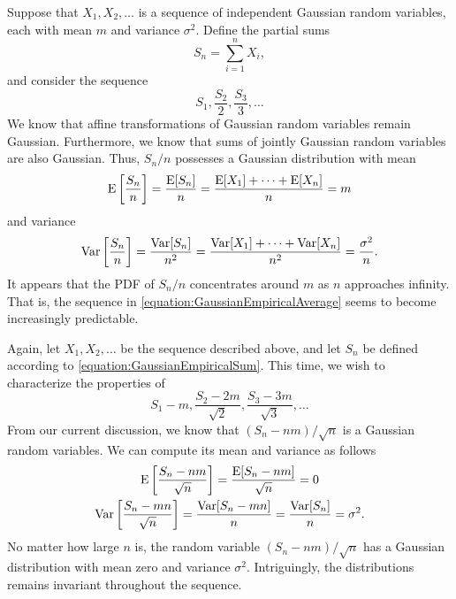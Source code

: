 \begin{example} \label{example:GaussianLLN}
Suppose that $X_1, X_2, \ldots$ is a sequence of independent Gaussian random variables, each with mean $m$ and variance $\sigma^2$.
Define the partial sums
\begin{equation} \label{equation:GaussianEmpiricalSum}
S_n = \sum_{i=1}^n X_i ,
\end{equation}
and consider the sequence
\begin{equation} \label{equation:GaussianEmpiricalAverage}
S_1, \frac{S_2}{2}, \frac{S_3}{3}, \ldots
\end{equation}
We know that affine transformations of Gaussian random variables remain Gaussian.
Furthermore, we know that sums of jointly Gaussian random variables are also Gaussian.
Thus, $S_n / n$ possesses a Gaussian distribution with mean
\begin{equation*}
\mathrm{E} \left[ \frac{S_n}{n} \right]
= \frac{ \mathrm{E} [ S_n ] }{n}
= \frac{ \mathrm{E} [ X_1 ] + \cdots + \mathrm{E} [ X_n ] }{n}
= m
\end{equation*}
and variance
\begin{equation*}
\mathrm{Var} \left[ \frac{S_n}{n} \right]
= \frac{ \mathrm{Var} [ S_n ] }{n^2}
= \frac{ \mathrm{Var} [ X_1 ] + \cdots + \mathrm{Var} [ X_n ] }{n^2}
= \frac{ \sigma^2 }{n} .
\end{equation*}
It appears that the PDF of $S_n / n$ concentrates around $m$ as $n$ approaches infinity.
That is, the sequence in \eqref{equation:GaussianEmpiricalAverage} seems to become increasingly predictable.
\end{example}

\begin{example} \label{example:GaussianCLT}
Again, let $X_1, X_2, \ldots$ be the sequence described above, and let $S_n$ be defined according to \eqref{equation:GaussianEmpiricalSum}.
This time, we wish to characterize the properties of
\begin{equation*}
S_1 - m, \frac{S_2 - 2m}{\sqrt{2}}, \frac{S_3 - 3m}{\sqrt{3}}, \ldots
\end{equation*}
From our current discussion, we know that $(S_n -nm) / \sqrt{n}$ is a Gaussian random variables.
We can compute its mean and variance as follows
\begin{gather*}
\mathrm{E} \left[ \frac{S_n -nm}{\sqrt{n}} \right]
= \frac{ \mathrm{E} [ S_n - nm] }{\sqrt{n}}
= 0 \\
\mathrm{Var} \left[ \frac{S_n - mn}{\sqrt{n}} \right]
= \frac{ \mathrm{Var} [ S_n - mn] }{n}
= \frac{ \mathrm{Var} [ S_n ] }{n}
= \sigma^2 .
\end{gather*}
No matter how large $n$ is, the random variable $(S_n - nm)/\sqrt{n}$ has a Gaussian distribution with mean zero and variance $\sigma^2$.
Intriguingly, the distributions remains invariant throughout the sequence.
\end{example}


